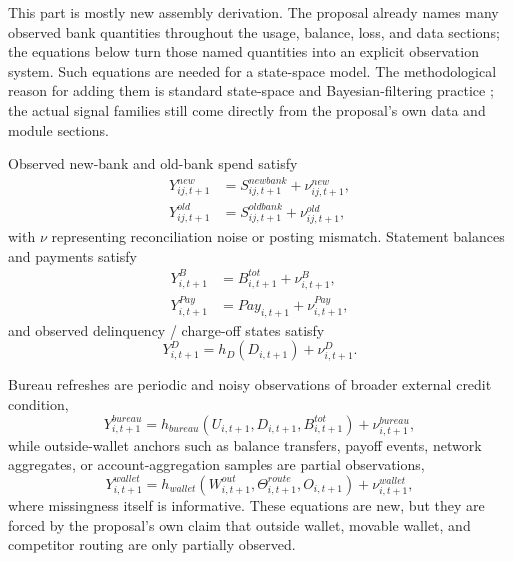 \documentclass[11pt]{article}
\newcommand{\1}{\mathbf{1}}
\begin{document}
This part is mostly new assembly derivation. The proposal already names many
observed bank quantities throughout the usage, balance, loss, and data sections;
the equations below turn those named quantities into an explicit observation
system. Such equations are needed for a state-space model. The methodological
reason for adding them is standard
state-space and Bayesian-filtering practice
\citep{durbinkoopman2012ssm,westharrison1997bfdm,doucet2001smc}; the actual
signal families still come directly from the proposal's own data and module
sections.

Observed new-bank and old-bank spend satisfy
\begin{align}
  Y^{new}_{ij,t+1} &= S^{newbank}_{ij,t+1} + \nu^{new}_{ij,t+1},
    \label{eq:ss-obs-new}\\
  Y^{old}_{ij,t+1} &= S^{oldbank}_{ij,t+1} + \nu^{old}_{ij,t+1},
    \label{eq:ss-obs-old}
\end{align}
with $\nu$ representing reconciliation noise or posting mismatch.
Statement balances and payments satisfy
\begin{align}
  Y^B_{i,t+1} &= B^{tot}_{i,t+1} + \nu^B_{i,t+1},
    \label{eq:ss-obs-balance}\\
  Y^{Pay}_{i,t+1} &= Pay_{i,t+1} + \nu^{Pay}_{i,t+1},
    \label{eq:ss-obs-payment}
\end{align}
and observed delinquency / charge-off states satisfy
\begin{equation}
  Y^D_{i,t+1} = h_D(D_{i,t+1}) + \nu^{D}_{i,t+1}.
  \label{eq:ss-obs-delinquency}
\end{equation}

Bureau refreshes are periodic and noisy observations of broader external credit
condition,
\begin{equation}
  Y^{bureau}_{i,t+1}
  =
  h_{bureau}(U_{i,t+1},D_{i,t+1},B^{tot}_{i,t+1}) + \nu^{bureau}_{i,t+1},
  \label{eq:ss-obs-bureau}
\end{equation}
while outside-wallet anchors such as balance transfers, payoff events, network
aggregates, or account-aggregation samples are partial observations,
\begin{equation}
  Y^{wallet}_{i,t+1}
  =
  h_{wallet}(W^{out}_{i,t+1},\Theta^{route}_{i,t+1},O_{i,t+1})
  + \nu^{wallet}_{i,t+1},
  \label{eq:ss-obs-wallet}
\end{equation}
where missingness itself is informative. These equations are new, but they are
forced by the proposal's own claim that outside wallet, movable wallet, and
competitor routing are only partially observed.
\end{document}

